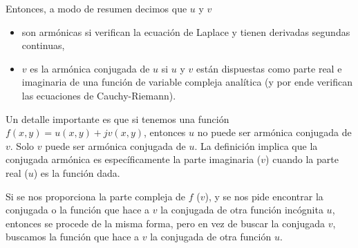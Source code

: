 Entonces, a modo de resumen decimos que $u$ y $v$
\begin{itemize}
  \item son armónicas si verifican la ecuación de Laplace y tienen derivadas segundas continuas,
  \item $v$ es la armónica conjugada de $u$ si $u$ y $v$ están dispuestas como parte real e imaginaria de una función de variable compleja analítica (y por ende verifican las ecuaciones de Cauchy-Riemann).
\end{itemize}

Un detalle importante es que si tenemos una función $f(x,y)=u(x,y)+jv(x,y)$, entonces $u$ no puede ser armónica conjugada de $v$. Solo $v$ puede ser armónica conjugada de $u$. La definición implica que la conjugada armónica es específicamente la parte imaginaria ($v$) cuando la parte real ($u$) es la función dada. 

Si se nos proporciona la parte compleja de $f$ ($v$), y se nos pide encontrar la conjugada o la función que hace a $v$ la conjugada de otra función incógnita $u$, entonces se procede de la misma forma, pero en vez de buscar la conjugada $v$, buscamos la función que hace a $v$ la conjugada de otra función $u$.
